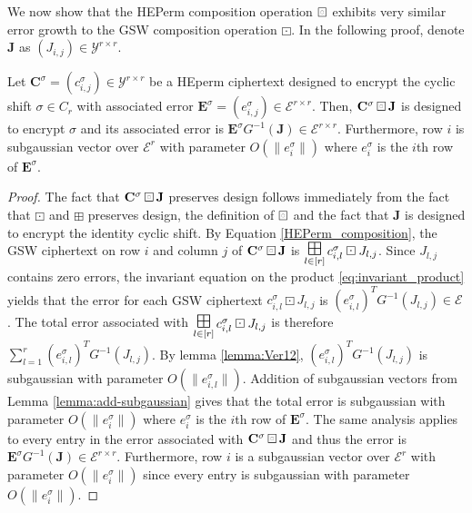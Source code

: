 We now show that the HEPerm composition operation $\boxring$ exhibits very similar error growth to the GSW composition operation $\boxdot$. In the following proof, denote $\mathbf{J}$ as $(J_{i,j}) \in \mathcal{Y}^{r \times r}$. 
\begin{lemma}\label{lemma:HEperm_error}
    Let $\mathbf{C}^{\sigma} = (c^{\sigma}_{i,j}) \in \mathcal{Y}^{r \times r}$ be a HEperm ciphertext designed to encrypt the cyclic shift $\sigma \in C_r$ with associated error $\mathbf{E}^{\sigma} = (e^{\sigma}_{i,j}) \in \mathcal{E}^{r \times r}$. Then, $\mathbf{C}^{\sigma} \boxring \mathbf{J}$ is designed to encrypt $\sigma$ and its associated error is $\mathbf{E}^{\sigma} G^{-1}(\mathbf{J}) \in \mathcal{E}^{r \times r}$. Furthermore, row $i$ is subgaussian vector over $\mathcal{E}^r$ with parameter $O(\|e^{\sigma}_i\|)$ where $e^{\sigma}_i$ is the $i$th row of $\mathbf{E}^{\sigma}$. 
\end{lemma}
\begin{proof}
    The fact that $\mathbf{C}^{\sigma} \boxring \mathbf{J}$ preserves design follows immediately from the fact that $\boxdot$ and $\boxplus$ preserves design, the definition of $\boxring$ and the fact that $\mathbf{J}$ is designed to encrypt the identity cyclic shift.
    By Equation \ref{HEPerm_composition}, the GSW ciphertext on row $i$ and column $j$ of $\mathbf{C}^{\sigma} \boxring \mathbf{J}$ is $\bigboxplus\limits_{l \in [r]} c_{i,l}^{\sigma} \boxdot J_{l,j}$. Since $J_{l,j}$ contains zero errors, the invariant equation on the product \ref{eq:invariant_product} yields that the error for each GSW ciphertext $c_{i,l}^{\sigma} \boxdot J_{l,j}$ is $(e_{i,l}^{\sigma})^T G^{-1}(J_{l,j}) \in \mathcal{E}$. The total error associated with $\bigboxplus\limits_{l \in [r]} c_{i,l}^{\sigma} \boxdot J_{l,j}$ is therefore $\sum\limits_{l=1}^r (e_{i,l}^{\sigma})^T G^{-1}(J_{l,j})$. By lemma \ref{lemma:Ver12}, $(e_{i,l}^{\sigma})^T G^{-1}(J_{l,j})$ is subgaussian with parameter $O(\|e_{i,l}^{\sigma}\|)$. Addition of subgaussian vectors from Lemma \ref{lemma:add-subgaussian} gives that the total error is subgaussian with parameter $O(\|e_i^{\sigma}\|)$ where $e_i^{\sigma}$ is the $i$th row of $\mathbf{E}^{\sigma}$. The same analysis applies to every entry in the error associated with $\mathbf{C}^{\sigma} \boxring \mathbf{J}$ and thus the error is $\mathbf{E}^{\sigma} G^{-1}(\mathbf{J}) \in \mathcal{E}^{r \times r}$. Furthermore, row $i$ is a subgaussian vector over $\mathcal{E}^r$ with parameter $O(\|e^{\sigma}_i\|)$ since every entry is subgaussian with parameter $O(\|e^{\sigma}_i\|)$.
\end{proof}
